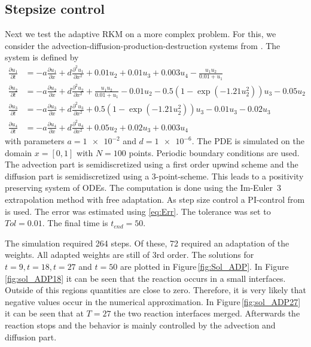 \documentclass[a4paper]{article}
\numberwithin{equation}{section}
\theoremstyle{plain}
\theoremstyle{definition}
\numberwithin{theorem}{section}
\newcommand{\1}{\mathbbm{1}}
\begin{document}
\subsection{Stepsize control}

Next we test the adaptive RKM on a more complex problem. 
For this, we consider the advection-diffusion-production-destruction systems from \cite{kopecz_comparison_2019}. The system is defined by
\begin{subequations}
\label{eq:ADR}
\begin{align}
\frac{\partial u_1}{\partial t} &=-a \frac{\partial u_1}{\partial x} + d\frac{\partial^2 u_1}{\partial x ^2} + 0.01u_2 + 0.01 u_3 +0.003u_4 - \frac{u_1 u_2}{0.01+u_1} \\ 
\frac{\partial u_2}{\partial t} &=-a \frac{\partial u_2}{\partial x} + d\frac{\partial^2 u_2}{\partial x ^2} + \frac{u_1u_2}{0.01+u_1} -0.01 u_2-0.5(1-\exp(-1.21 u_2^2)) u_3 -0.05 u_2 \\ 
\frac{\partial u_3}{\partial t} &=-a \frac{\partial u_3}{\partial x} + d\frac{\partial^2 u_3}{\partial x ^2} + 0.5(1-\exp(-1.21u_2^2)) u_3 - 0.01 u_3 -0.02 u_3 \\ 
\frac{\partial u_4}{\partial t} &=-a \frac{\partial u_4}{\partial x} + d\frac{\partial^2 u_4}{\partial x ^2} + 0.05 u_2 + 0.02 u_3 + 0.003u_4 
\end{align}
\end{subequations}
with parameters $a=\num{1e-2} $ and $ d=\num{1e-6}$.
The PDE is simulated on the domain $x = [0,1]$ with $N=100$ points. Periodic boundary conditions are used. 
The advection part is semidiscretized using a first order upwind scheme and the diffusion part is semidiscretized using a 3-point-scheme. This leads to a positivity preserving system of ODEs.
The computation is done using the Im-Euler~3 extrapolation
method with free adaptation.
As step size control a PI-control from\,\cite{hairer_solving_1996} is used. The error was estimated using \eqref{eq:Err}. The tolerance was set to $Tol = 0.01$.
The final time is $t_{end} = 50$.

The simulation required 264 steps. Of these, 72 required an adaptation of the weights. 
All adapted weights are still of 3rd order.
The solutions for $t=9,t=18,t=27$ and $t=50$ are plotted in Figure\,\ref{fig:Sol_ADP}. 
In Figure\,\ref{fig:sol_ADP18} it can be seen that the reaction occurs in a small interfaces. 
Outside of this regions quantities are close to zero. Therefore, it is very likely that negative values occur in the numerical approximation.
In Figure\,\ref{fig:sol_ADP27} it can be seen that at $T=27$ the two reaction interfaces merged. Afterwards the reaction stops and the behavior is mainly controlled by the advection and diffusion part.  
\end{document}
